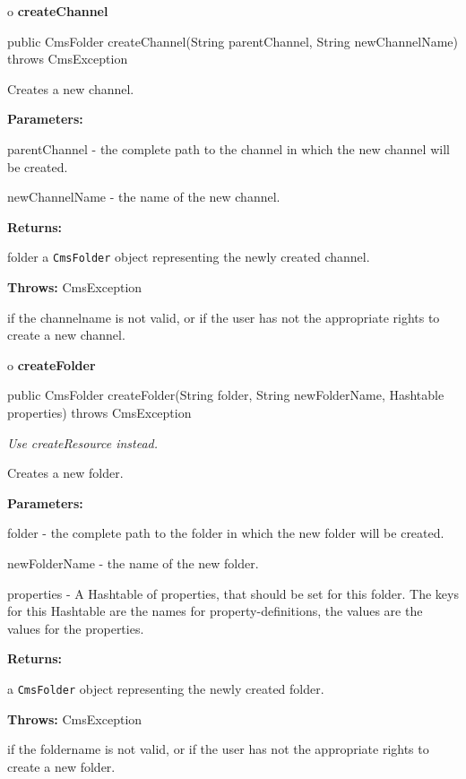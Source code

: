 o {\bf createChannel} 

\begin{PRE}
 public CmsFolder createChannel(String parentChannel,
                                String newChannelName) throws CmsException
\end{PRE}

\begin{description}
\htmlDD Creates a new channel. 

\begin{description}
\item {\bf Parameters:}  

parentChannel - the complete path to the channel in which the new channel will
be created.  

newChannelName - the name of the new channel.  
\item {\bf Returns:}  

folder a {\tt CmsFolder} object representing the newly created channel.  
\item {\bf Throws:} CmsException  

if the channelname is not valid, or if the user has not the appropriate rights
to create a new channel.  
\end{description}

\end{description}

o {\bf createFolder} 

\begin{PRE}
 public CmsFolder createFolder(String folder,
                               String newFolderName,
                               Hashtable properties) throws CmsException
\end{PRE}

\begin{description}
 {\it Use createResource
instead.} 

Creates a new folder. 

\begin{description}
\item {\bf Parameters:}  

folder - the complete path to the folder in which the new folder will be
created.  

newFolderName - the name of the new folder.  

properties - A Hashtable of properties, that should be set for this folder.
The keys for this Hashtable are the names for property-definitions, the values
are the values for the properties.  
\item {\bf Returns:}  

a {\tt CmsFolder} object representing the newly created folder.  
\item {\bf Throws:} CmsException  

if the foldername is not valid, or if the user has not the appropriate rights
to create a new folder.  
\end{description}

\end{description}

